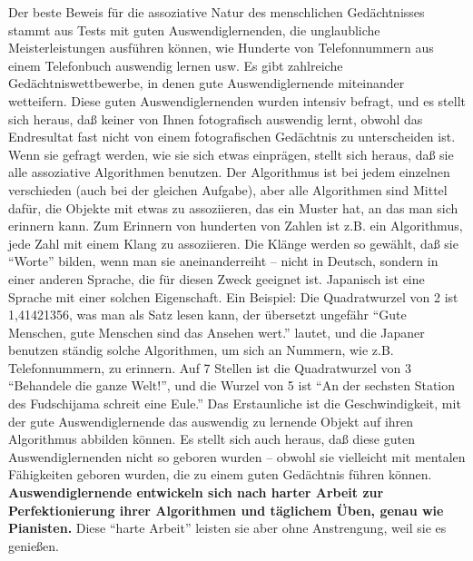 Der beste Beweis für die assoziative Natur des menschlichen Gedächtnisses stammt aus Tests mit guten Auswendiglernenden, die unglaubliche Meisterleistungen ausführen können, wie Hunderte von Telefonnummern aus einem Telefonbuch auswendig lernen usw.
Es gibt zahlreiche Gedächtniswettbewerbe, in denen gute Auswendiglernende miteinander wetteifern.
Diese guten Auswendiglernenden wurden intensiv befragt, und es stellt sich heraus, daß keiner von Ihnen fotografisch auswendig lernt, obwohl das Endresultat fast nicht von einem fotografischen Gedächtnis zu unterscheiden ist.
Wenn sie gefragt werden, wie sie sich etwas einprägen, stellt sich heraus, daß sie alle assoziative Algorithmen benutzen.
Der Algorithmus ist bei jedem einzelnen verschieden (auch bei der gleichen Aufgabe), aber alle Algorithmen sind Mittel dafür, die Objekte mit etwas zu assoziieren, das ein Muster hat, an das man sich erinnern kann.
Zum Erinnern von hunderten von Zahlen ist z.B. ein Algorithmus, jede Zahl mit einem Klang zu assoziieren.
Die Klänge werden so gewählt, daß sie \enquote{Worte} bilden, wenn man sie aneinanderreiht -- nicht in Deutsch, sondern in einer anderen Sprache, die für diesen Zweck geeignet ist.
Japanisch ist eine Sprache mit einer solchen Eigenschaft.
Ein Beispiel: Die Quadratwurzel von 2 ist 1,41421356, was man als Satz lesen kann, der übersetzt ungefähr \enquote{Gute Menschen, gute Menschen sind das Ansehen wert.} lautet, und die Japaner benutzen ständig solche Algorithmen, um sich an Nummern, wie z.B. Telefonnummern, zu erinnern.
Auf 7 Stellen ist die Quadratwurzel von 3 \enquote{Behandele die ganze Welt!}, und die Wurzel von 5 ist \enquote{An der sechsten Station des Fudschijama schreit eine Eule.}
Das Erstaunliche ist die Geschwindigkeit, mit der gute Auswendiglernende das auswendig zu lernende Objekt auf ihren Algorithmus abbilden können.
Es stellt sich auch heraus, daß diese guten Auswendiglernenden nicht so geboren wurden -- obwohl sie vielleicht mit mentalen Fähigkeiten geboren wurden, die zu einem guten Gedächtnis führen können.
\textbf{Auswendiglernende entwickeln sich nach harter Arbeit zur Perfektionierung ihrer Algorithmen und täglichem Üben, genau wie Pianisten.}
Diese \enquote{harte Arbeit} leisten sie aber ohne Anstrengung, weil sie es genießen.

